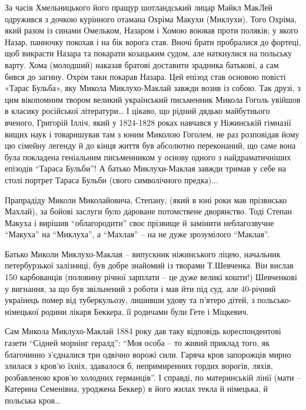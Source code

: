 За часів Хмельницького його пращур шотландський лицар Майкл МакЛей одружився з
дочкою курінного отамана Охріма Макухи (Миклухи). Того Охріма, який разом із
синами Омельком, Назаром і Хомою воював проти поляків; у якого Назар, панночку
покохав і на бік ворога став. Вночі брати пробралися до фортеці, щоб викрасти
Назара та покарати козацьким судом, але наткнулися на польську варту. Хома
(молодший) наказав братові доставити зрадника батькові, а сам бився до загину.
Охрім таки покарав Назара. Цей епізод став основою повісті «Тарас Бульба», яку
Микола Миклухо-Маклай завжди возив із собою. Так друзі, з цим вікопомним твором
великий український письменник Микола Гоголь увійшов в класику російської
літератури… І цікаво, що рідний дядько майбутнього вченого, Григорій Ілліч,
який у 1824-1828 роках навчався у Ніжинській гімназії вищих наук і товаришував
там з юним Миколою Гоголем, не раз розповідав йому цю сімейну легенду й до
кінця життя був абсолютно переконаний, що саме вона була покладена геніальним
письменником у основу одного з найдраматичніших епізодів \enquote{Тараса Бульби}! А
батько Миклухи-Маклая завжди тримав у себе на столі портрет Тараса Бульби
(свого символічного предка)...


Прапрадіду Миколи Миколайовича, Степану, (який в юні роки мав прізвисько
Махлай), за бойові заслуги було дароване потомствене дворянство. Тоді Степан
Макуха і вирішив \enquote{облагородити} своє прізвище й замінити неблагозвучне \enquote{Макуха}
на \enquote{Миклуха}, а \enquote{Махлая} – на не дуже зрозумілого \enquote{Маклая}.

Батько Миколи Миклухо-Маклая – випускник ніжинського ліцею, начальник
петербурзької залізниці, був добре знайомий із творами Т.Шевченка. Він вислав
150 карбованців (половину річної зарплати – це дуже великі кошти!) Шевченкові у
вигнання, за що був звільнений з роботи і мав йти під суд, але 40-річний
українець помер від туберкульозу, лишивши удову та п'ятеро дітей, з
польсько-німецької родини лікаря Беккера, її родичами були Гете і Міцкевич.


Сам Микола Миклухо-Маклай 1884 року дав таку відповідь кореспондентові газети
\enquote{Сідней морнінг гералд}: \enquote{Моя особа – то живий приклад того, як благочинно
з'єдналися три одвічно ворожі сили. Гаряча кров запорожців мирно злилася з
кров'ю їхніх, здавалося б, непримиренних гордих ворогів, ляхів, розбавленою
кров'ю холодних германців}. І справді, по материнській лінії (мати – Катерина
Семенівна, уроджена Беккер) в його жилах текла й німецька, й польська кров…

